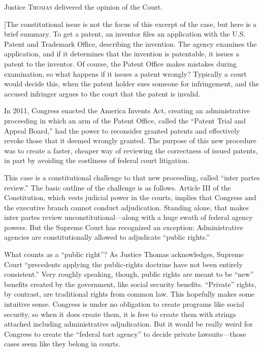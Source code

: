 
\opinion Justice \textsc{Thomas} delivered the opinion of the Court.

[The constitutional issue is not the focus of this excerpt of the case, but here
is a brief summary. To get a patent, an inventor files an application with the
U.S. Patent and Trademark Office, describing the invention. The agency examines
the application, and if it determines that the invention is patentable, it
issues a patent to the inventor. Of course, the Patent Office makes mistakes
during examination, so what happens if it issues a patent wrongly? Typically a
court would decide this, when the patent holder sues someone for infringement,
and the accused infringer argues to the court that the patent is invalid.

In 2011, Congress enacted the America Invents Act, creating an administrative
proceeding in which an arm of the Patent Office, called the ``Patent Trial and
Appeal Board,'' had the power to reconsider granted patents and effectively
revoke those that it deemed wrongly granted. The purpose of this new procedure
was to create a faster, cheaper way of reviewing the correctness of issued
patents, in part by avoiding the costliness of federal court litigation.

This case is a constitutional challenge to that new proceeding, called ``inter
partes review.'' The basic outline of the challenge is as follows. Article III
of the Constitution, which vests judicial power in the courts, implies that
Congress and the executive branch cannot conduct adjudication. Standing alone,
that makes inter partes review unconstitutional---along with a huge swath of
federal agency powers. But the Supreme Court has recognized an exception:
Administrative agencies are constitutionally allowed to adjudicate ``public
rights.''

What counts as a ``public right''? As Justice Thomas acknowledges, Supreme Court
``precedents applying the public-rights doctrine have not been entirely
consistent.'' Very roughly speaking, though, public rights are meant to be
``new'' benefits created by the government, like social security benefits.
``Private'' rights, by contrast, are traditional rights from common law. This
hopefully makes some intuitive sense. Congress is under no obligation to create
programs like social security, so when it does create them, it is free to create
them with strings attached including administrative adjudication. But it would
be really weird for Congress to create the ``federal tort agency'' to decide
private lawsuits---those cases seem like they belong in courts.

